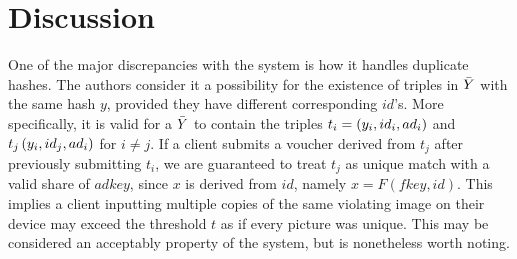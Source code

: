 
\section{Discussion} %
\label{sec:discussion}


One of the major discrepancies with the system is how it handles duplicate hashes. The authors consider it a possibility for the existence of triples in $\bar{Y} $ with the same hash $y$, provided they have different corresponding $id$'s. More specifically, it is valid for a $\bar{Y}$ to contain the triples $t_i = \left(y_i, id_i, ad_i\right)$ and $t_j \left(y_i, id_j, ad_i\right)$ for $i \neq j$. 
If a client submits a voucher derived from $t_j$ after previously submitting $t_i$, we are guaranteed to treat $t_j$ as unique match with a valid share of $adkey$, since $x$ is derived from $id$, namely $x = F(fkey,id)$. This implies a client inputting multiple copies of the same violating image on their device may exceed the threshold $t$ as if every picture was unique. This may be considered an acceptably property of the system, but is nonetheless worth noting.